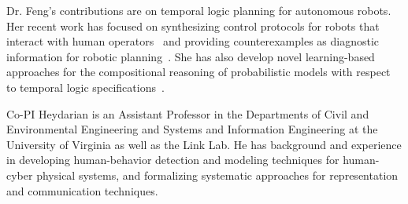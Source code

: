 Dr. Feng's contributions are on temporal logic planning for autonomous robots. Her recent work has focused on synthesizing control protocols for robots that interact with human operators~\cite{feng2016synthesis,feng2015controller} and providing counterexamples as diagnostic information for robotic planning~\cite{feng2018cex,feng2016human}.
She has also develop novel learning-based approaches for the compositional reasoning of probabilistic models with respect to temporal logic specifications~\cite{feng2013learning,feng2011learning,feng2011automated,feng2010compositional}.

Co-PI Heydarian is an Assistant Professor in the Departments of Civil and Environmental Engineering and Systems and Information Engineering at the University of Virginia as well as the Link Lab. He has background and experience in developing human-behavior detection and modeling techniques for human-cyber physical systems, and formalizing systematic approaches for representation and communication techniques.  

